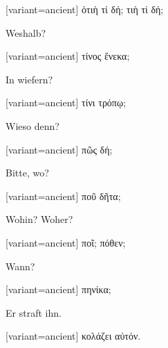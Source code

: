 \switchcolumn

\begin{greek}[variant=ancient]%
ὁτιὴ τί δή; τιὴ τί δή;

\end{greek}%
\switchcolumn*

Wes\textcompwordmark{}halb?

\switchcolumn

\begin{greek}[variant=ancient]%
τίνος ἕνεκα;

\end{greek}%
\switchcolumn*

In wiefern?

\switchcolumn

\begin{greek}[variant=ancient]%
τίνι τρόπῳ;

\end{greek}%
\switchcolumn*

Wieso denn?

\switchcolumn

\begin{greek}[variant=ancient]%
πῶς δή;

\end{greek}%
\switchcolumn*

Bitte, wo?

\switchcolumn

\begin{greek}[variant=ancient]%
ποῦ δῆτα;

\end{greek}%
\switchcolumn*

Wohin? Woher?

\switchcolumn

\begin{greek}[variant=ancient]%
ποῖ; πόθεν;

\end{greek}%
\switchcolumn*

Wann?

\switchcolumn

\begin{greek}[variant=ancient]%
πηνίκα;

\end{greek}%
\switchcolumn*

Er straft ihn.

\switchcolumn

\begin{greek}[variant=ancient]%
κολάζει αὐτόν.

\end{greek}%
\switchcolumn*

